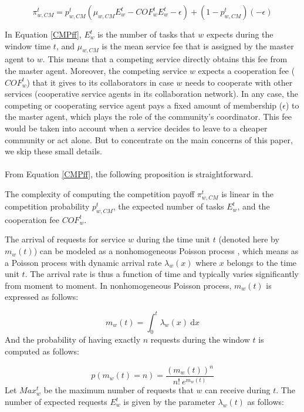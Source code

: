 \begin{equation}\label{CMPff}
\pi_{w,CM}^t=p_{w,CM}^t(\mu_{w, CM}E^t_w-COF_w^t
E^t_w-\epsilon)+(1-p_{w,CM}^t)(-\epsilon)
\end{equation}

In Equation \ref{CMPff}, $E^t_w$ is the number of tasks that $w$
expects during the window time $t$, and $\mu_{w, CM}$ is the mean
service fee that is assigned by the master agent to $w$. This
means that a competing service directly obtains this fee from the
master agent. Moreover, the competing service $w$ expects a
cooperation fee ($COF_w^t$) that it gives to its collaborators in
case $w$ needs to cooperate with other services (cooperative
service agents in its collaboration network). In any case, the
competing or cooperating service agent pays a fixed amount of
membership ($\epsilon$) to the master agent, which plays the role
of the community's coordinator. This fee would be taken into
account when a service decides to leave to a cheaper community or
act alone. But to concentrate on the main concerns of this paper,
we skip these small details.\\\\
%
From Equation \ref{CMPff}, the following proposition is
straightforward.

\begin{proposition}\label{Complexity-Competition_Payoff}
The complexity of computing the competition payoff $\pi_{w,CM}^t$
is linear in the competition probability $p_{w,CM}^t$, the
expected number of tasks $E^t_w$, and the cooperation fee
$COF_w^t$.
\end{proposition}


The arrival of requests for service $w$ during the time unit $t$
(denoted here by $m_w(t)$) can be modeled as a nonhomogeneous
Poisson process \cite{DBLP:conf/icws/KhosravifarBM10,RePEc:spr:sistpr:v:8:y:2005:i:3:p:311-329}, which
means as a Poisson process with dynamic arrival rate
$\lambda_w(x)$ where $x$ belongs to the time unit $t$. The arrival
rate is thus a function of time and typically varies significantly
from moment to moment. In nonhomogeneous Poisson process, $m_w(t)$
is expressed as follows:

$$ m_w(t)= \int_0^t \! \lambda_w(x) \ \mathrm{d}x$$
%
And the probability of having exactly $n$ requests during the
window $t$ is computed as follows:

$$ p(m_w(t) = n) = \frac{(m_w(t))^n}{n! \ e^{m_w(t)}}  $$
%
Let $Max_w^t$ be the maximum number of requests that $w$ can
receive during $t$. The number of expected requests $E^t_w$ is
given by the parameter $\lambda_w(t)$ as follows:

